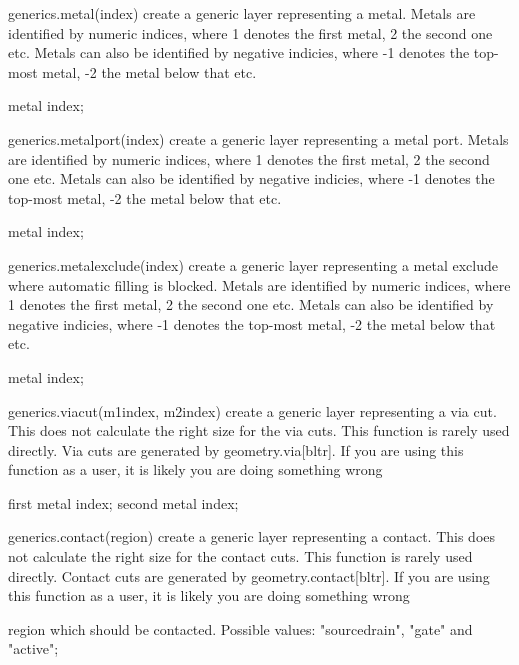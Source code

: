 \begin{APIfunc}{generics.metal(index)}
    create a generic layer representing a metal. Metals are identified by numeric indices, where 1 denotes the first metal, 2 the second one etc. Metals can also be identified by negative indicies, where -1 denotes the top-most metal, -2 the metal below that etc.
    \begin{APIparameters}
            metal index;
    \end{APIparameters}
\end{APIfunc}
\begin{APIfunc}{generics.metalport(index)}
    create a generic layer representing a metal port. Metals are identified by numeric indices, where 1 denotes the first metal, 2 the second one etc. Metals can also be identified by negative indicies, where -1 denotes the top-most metal, -2 the metal below that etc.
    \begin{APIparameters}
            metal index;
    \end{APIparameters}
\end{APIfunc}
\begin{APIfunc}{generics.metalexclude(index)}
    create a generic layer representing a metal exclude where automatic filling is blocked. Metals are identified by numeric indices, where 1 denotes the first metal, 2 the second one etc. Metals can also be identified by negative indicies, where -1 denotes the top-most metal, -2 the metal below that etc.
    \begin{APIparameters}
            metal index;
    \end{APIparameters}
\end{APIfunc}
\begin{APIfunc}{generics.viacut(m1index, m2index)}
    create a generic layer representing a via cut. This does not calculate the right size for the via cuts. This function is rarely used directly. Via cuts are generated by geometry.via[bltr]. If you are using this function as a user, it is likely you are doing something wrong
    \begin{APIparameters}
            first metal index;
            second metal index;
    \end{APIparameters}
\end{APIfunc}
\begin{APIfunc}{generics.contact(region)}
    create a generic layer representing a contact. This does not calculate the right size for the contact cuts. This function is rarely used directly. Contact cuts are generated by geometry.contact[bltr]. If you are using this function as a user, it is likely you are doing something wrong
    \begin{APIparameters}
            region which should be contacted. Possible values: "sourcedrain", "gate" and "active";
    \end{APIparameters}
\end{APIfunc}
